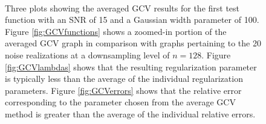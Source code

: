 \begin{figure}
	\centering
     \\
    \caption[]{\doublespace Three plots showing the averaged GCV results for the first test function with an SNR of 15 and a Gaussian width parameter of 100. Figure \ref{fig:GCVfunctions} shows a zoomed-in portion of the averaged GCV graph in comparison with graphs pertaining to the 20 noise realizations at a downsampling level of $n = 128$. Figure \ref{fig:GCVlambdas} shows that the resulting regularization parameter is typically less than the average of the individual regularization parameters. Figure \ref{fig:GCVerrors} shows that the relative error corresponding to the parameter chosen from the average GCV method is greater than the average of the individual relative errors.}
\label{fig:GCVplots}
\end{figure}

